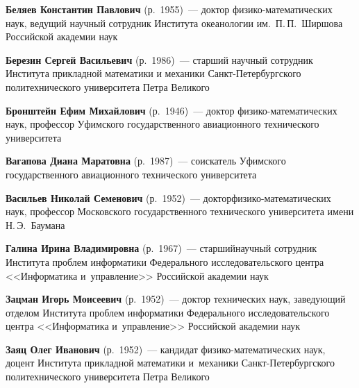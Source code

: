 \begin{multicols}{2}

\noindent
\textbf{Беляев Константин Павлович} (р.\ 1955)~---
 доктор фи\-зи\-ко-ма\-те\-ма\-ти\-че\-ских наук, ведущий научный
 сотрудник Института океанологии им.\ П.\,П.~Ширшова Российской академии наук

 \vspace*{3pt}

 \noindent
\textbf{Березин Сергей Васильевич} (р.\ 1986)~---
старший научный сотрудник Института прикладной математики и механики
Санкт-Пе\-тер\-бург\-ско\-го политехнического университета Петра Великого

 \vspace*{3pt}

 \noindent
\textbf{Бронштейн Ефим Михайлович} (р.\ 1946)~---
доктор фи\-зи\-ко-ма\-те\-ма\-ти\-че\-ских наук, профессор Уфимского
государственного авиационного технического университета

 \vspace*{3pt}

\noindent
\textbf{Вагапова Диана Маратовна} (р.\ 1987)~---
соискатель Уфимского государственного авиационного технического университета

 \vspace*{3pt}

 \noindent
\textbf{Васильев Николай Семенович} (р.\ 1952)~---
 доктор\linebreak фи\-зи\-ко-ма\-те\-ма\-ти\-че\-ских наук, профессор
 Московского государственного технического университета имени Н.\,Э.~Баумана

 \vspace*{3pt}

 \noindent
\textbf{Галина Ирина Владимировна} (р.\ 1967)~---
старший\linebreak научный сотрудник Института проблем информатики Федерального
исследовательского центра <<Информатика и~управ\-ле\-ние>>
Российской академии наук

 \vspace*{3pt}

 \noindent
\textbf{Зацман Игорь Моисеевич} (р.\ 1952)~--- доктор технических наук, заведующий
отделом Института \mbox{проблем} информатики Федерального исследовательского центра
<<Информатика и~управ\-ле\-ние>> Российской академии наук

 \vspace*{3pt}

 \noindent
\textbf{Заяц Олег Иванович} (р.\ 1952)~---
кандидат фи\-зи\-ко-ма\-те\-ма\-ти\-че\-ских наук, доцент Института
прикладной математики и~механики Санкт-Пе\-тер\-бург\-ско\-го политехнического университета Петра Великого


\end{multicols}
